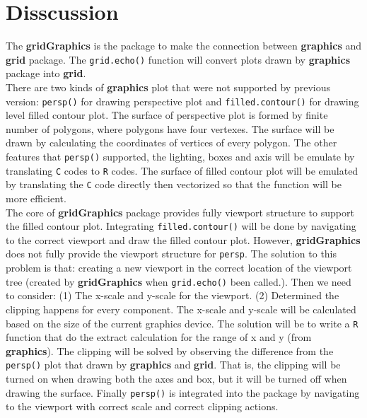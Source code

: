 \documentclass{report}
\begin{document}
\section{Disscussion}
The \textbf{gridGraphics} is the package to make the connection between \textbf{graphics} and \textbf{grid} package. The \texttt{grid.echo()} function will convert plots drawn by \textbf{graphics} package into \textbf{grid}.\\

There are two kinds of \textbf{graphics} plot that were not supported by previous version: \texttt{persp()} for drawing perspective plot and \texttt{filled.contour()} for drawing level filled contour plot. The surface of perspective plot is formed by finite number of polygons, where polygons have four vertexes. The surface will be drawn by calculating the coordinates of vertices of every polygon. The other features that \texttt{persp()} supported, the lighting, boxes and axis will be emulate by translating \texttt{C} codes to \texttt{R} codes. The surface of filled contour plot will be emulated by translating the \texttt{C} code directly then vectorized so that the function will be more efficient. \\

The core of \textbf{gridGraphics} package provides fully viewport structure to support the filled contour plot. Integrating \texttt{filled.contour()} will be done by navigating to the correct viewport and draw the filled contour plot. However, \textbf{gridGraphics} does not fully provide the viewport structure for \texttt{persp}. The solution to this problem is that: creating a new viewport in the correct location of the viewport tree (created by \textbf{gridGraphics} when \texttt{grid.echo()} been called.). Then we need to consider: (1) The x-scale and y-scale for the viewport. (2) Determined the clipping happens for every component. The x-scale and y-scale will be calculated based on the size of the current graphics device. The solution will be to write a \texttt{R} function that do the extract calculation for the range of x and y (from \textbf{graphics}). The clipping will be solved by observing the difference from the \texttt{persp()} plot that drawn by \textbf{graphics} and \textbf{grid}. That is, the clipping will be turned on when drawing both the axes and box, but it will be turned off when drawing the surface. Finally \texttt{persp()} is integrated into the package by navigating to the viewport with correct scale and correct clipping actions.\\
\end{document}
